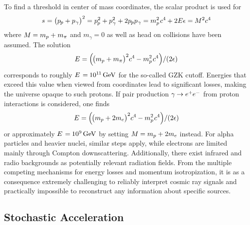 To find a threshold in center of mass coordinates, the scalar product is used for
\begin{equation*}
	s \kern+0.3pt = \bigl( p_{\kern-0.5pt p} + p_{\kern+0.5pt \gamma} \bigr)^2 =
	p_{\kern-0.5pt p}^2 + p_{\kern+0.5pt \gamma}^2 + 2 p_{\kern-0.5pt p} p_{\kern+0.5pt \gamma} =
	m_p^2 \kern+0.8pt c^4 \kern-0.2pt + 2 E \epsilon = \kern-0.2pt M^2c^4
\end{equation*}
where $M \kern-0.3pt = m_p + \kern+0.3pt m_\pi$ and $m_\gamma = 0$ as well as head on collisions have been assumed. The solution
\begin{equation*}
	E = \Bigl( \kern-1.0pt \bigl( m_p + m_\pi \bigr)^2 c^4 \kern-0.2pt - m_p^2 \kern+0.8pt c^4 \Bigr) / (2\epsilon)
\end{equation*}
corresponds to roughly $E \kern+1.0pt = \kern-0.5pt 10^{1 \kern-0.3pt 1} \kern+1.5pt \unit{\giga\electronvolt}$ for the so-called
GZK cutoff. Energies that exceed this value when viewed from  coordinates lead to significant losses, making the universe
opaque to such protons. If pair production $\gamma \kern-0.5pt \rightarrow \smash{e^+ \kern-0.5pt e^-}$ from proton interactions is
considered, one finds
\begin{equation*}
	E = \Bigl( \kern-1.0pt \bigl( m_p + 2m_e \bigr)^2 c^4 \kern-0.2pt - m_p^2 \kern+0.8pt c^4 \Bigr) / (2\epsilon)
\end{equation*}
or approximately $E \kern+1.0pt = \kern-0.5pt \qty{e+9}{\giga\electronvolt}$ by setting $M \kern-0.3pt = m_p + \kern+0.3pt 2m_e$
instead. For alpha particles and heavier nuclei, similar steps apply, while electrons are limited mainly through Compton
downscattering. Additionally, there exist infrared and radio backgrounds as potentially relevant radiation fields. From
the multiple competing mechanisms for energy losses and momentum isotropization, it is as a consequence extremely challenging
to reliably interpret cosmic ray signals and practically impossible to reconstruct any information about specific sources.



\subsection{Stochastic Acceleration}
\label{sub:acceleration}

